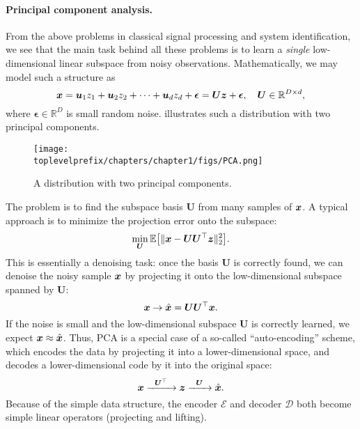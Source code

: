 \documentclass[../../book-main.tex]{subfiles}
\begin{document}
\paragraph{Principal component analysis.}
From the above problems in classical signal processing and system identification, we see that the main task behind all these problems is to learn a \textit{single} low-dimensional linear subspace from noisy observations. Mathematically, we may model such a structure as
\begin{equation}
    \bm{x} = \boldsymbol{u}_1 z_1 + \boldsymbol{u}_2 z_2 + \cdots + \boldsymbol{u}_d z_d + \boldsymbol{\epsilon} =  \boldsymbol{U} \bm{z} + \boldsymbol{\epsilon}, \quad \boldsymbol{U} \in \mathbb{R}^{D\times d},
    \label{eqn:PCA-model}
\end{equation}
where $\boldsymbol{\epsilon} \in \mathbb{R}^D$ is small random noise.  illustrates such a distribution with two principal components.
\begin{figure}
    \centering
    \texttt{[image: \\toplevelprefix/chapters/chapter1/figs/PCA.png]}
    \caption{A distribution with two principal components.}
    \label{fig:PCA}
\end{figure}
The problem is to find the subspace basis $\boldsymbol{U}$ from many samples of $\bm{x}$. A typical approach is to minimize the projection error onto the subspace:
\begin{equation}
    \min_{\boldsymbol{U}}\mathbb{E}\big[\|\bm{x} - \boldsymbol{U}\boldsymbol{U}^{\top} \bm{z}\|_2^2\big].
\end{equation}
This is essentially a denoising task: once the basis $\boldsymbol{U}$ is correctly found, we can denoise the noisy sample $\bm{x}$ by projecting it onto the low-dimensional subspace spanned by $\boldsymbol{U}$:
\begin{equation}
\bm{x} \rightarrow \hat {\bm{x}} = \boldsymbol{U}\boldsymbol{U}^\top \bm{x}. 
\end{equation}
If the noise is small and the low-dimensional subspace $\boldsymbol{U}$ is correctly learned, we expect $\bm{x} \approx \hat {\bm{x}}$. Thus, PCA is a special case of a so-called ``auto-encoding'' scheme, which encodes the data by projecting it into a lower-dimensional space, and decodes a lower-dimensional code by it into the original space:
\begin{equation}
    \bm{x}   \xrightarrow{\hspace{2mm} \boldsymbol{U}^\top\hspace{2mm}} \bm{z}  \xrightarrow{\hspace{2mm} \boldsymbol{U} \hspace{2mm}} \hat {\bm{x}}.
       \label{eqn:auto-encoding-PCA}
\end{equation}
Because of the simple data structure, the encoder $\mathcal{E}$ and decoder $\mathcal{D}$ both become simple linear operators (projecting and lifting).
\end{document}
